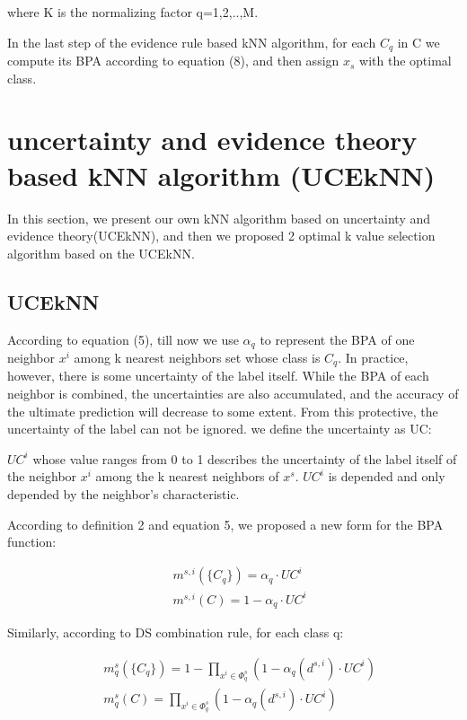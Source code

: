 \documentclass[runningheads]{llncs}
\begin{document}
where K is the normalizing factor q=1,2,..,M.

In the last step of the evidence rule based kNN algorithm, for each $C_q$ in C we compute its BPA according to equation (8), and then assign $x_s$ with the optimal class. 

\section{uncertainty and evidence theory based kNN algorithm (UCEkNN)}

In this section, we present our own kNN algorithm based on uncertainty and evidence theory(UCEkNN), and then we proposed 2 optimal k value selection algorithm based on the UCEkNN.

\subsection{UCEkNN}
According to equation (5), till now we use $\alpha _q$ to represent the BPA of one neighbor $x^i$ among k nearest neighbors set  whose class is $C_q$. In practice, however, there is some uncertainty of the label itself. While the BPA of each neighbor is combined, the uncertainties are also accumulated, and the accuracy of the ultimate prediction will decrease to some extent. From this protective, the uncertainty of the label can not be ignored. we define the uncertainty as UC:

\begin{definition}
 $UC^i$ whose value ranges from 0 to 1 describes the uncertainty of the label itself of the neighbor $x^i$ among the k nearest neighbors of $x^s$. $UC^i$ is depended and only depended by the neighbor's characteristic.
\end{definition}

According to definition 2 and equation 5, we proposed a new form for  the BPA function:

\begin{equation}
\begin{split}
&\ m^{s,i}( \{C_q\}) = \alpha_q \cdot {UC}^i
\\
&\ m^{s,i}(C) = 1-\alpha_q \cdot {UC}^i
\end{split}
\end{equation}

Similarly, according to DS combination rule, for each class q:

\begin{equation}
\begin{split}
&\ m^{s} _q( \{C_q\}) = 1- \prod_{x^i\in \Phi^s _q } (1-\alpha_q(d^{s,i} )\cdot UC^i)
\\
&\ m^{s} _q(C) = \prod_{x^i\in \Phi^s _q } (1-\alpha_q(d^{s,i} )\cdot UC^i)
\end{split}
\end{equation}
\end{document}
